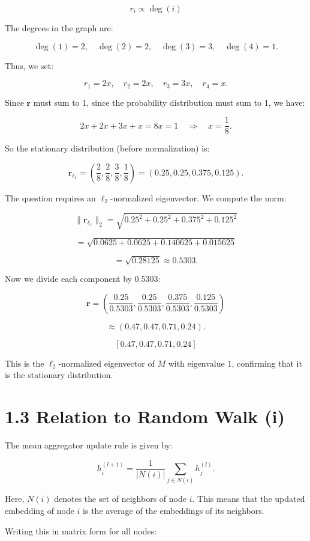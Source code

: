 \documentclass[a4paper,12pt]{article}
\begin{document}
\[
r_i \propto \deg(i)
\]

The degrees in the graph are:

\[
\deg(1) = 2, \quad \deg(2) = 2, \quad \deg(3) = 3, \quad \deg(4) = 1.
\]

Thus, we set:

\[
r_1 = 2x, \quad r_2 = 2x, \quad r_3 = 3x, \quad r_4 = x.
\]

Since \( \mathbf{r} \) must sum to 1, since the probability distribution must sum to 1, we have:

\[
2x + 2x + 3x + x = 8x = 1 \quad \Rightarrow \quad x = \frac{1}{8}.
\]

So the stationary distribution (before normalization) is:

\[
\mathbf{r}_{\ell_1} = \left( \frac{2}{8}, \frac{2}{8}, \frac{3}{8}, \frac{1}{8} \right)
= (0.25, 0.25, 0.375, 0.125).
\]


The question requires an \( \ell_2 \)-normalized eigenvector. We compute the norm:

\[
\|\mathbf{r}_{\ell_1}\|_2 = \sqrt{0.25^2 + 0.25^2 + 0.375^2 + 0.125^2}
\]

\[
= \sqrt{0.0625 + 0.0625 + 0.140625 + 0.015625}
\]

\[
= \sqrt{0.28125} \approx 0.5303.
\]

Now we divide each component by \( 0.5303 \):

\[
\mathbf{r} = \left( \frac{0.25}{0.5303}, \frac{0.25}{0.5303}, \frac{0.375}{0.5303}, \frac{0.125}{0.5303} \right)
\]

\[
\approx (0.47, 0.47, 0.71, 0.24).
\]

\[
\boxed{[0.47, 0.47, 0.71, 0.24]}
\]

This is the \(\ell_2\)-normalized eigenvector of \( M \) with eigenvalue \( 1 \), confirming that it is the stationary distribution.

\section*{1.3 Relation to Random Walk (i)}

The mean aggregator update rule is given by:

\[
h_{i}^{(l+1)} = \frac{1}{|N(i)|} \sum_{j \in N(i)} h_{j}^{(l)}.
\]

Here, \(N(i)\) denotes the set of neighbors of node \(i\). This means that the updated embedding of node \(i\) is the average of the embeddings of its neighbors.

Writing this in matrix form for all nodes:
\end{document}
